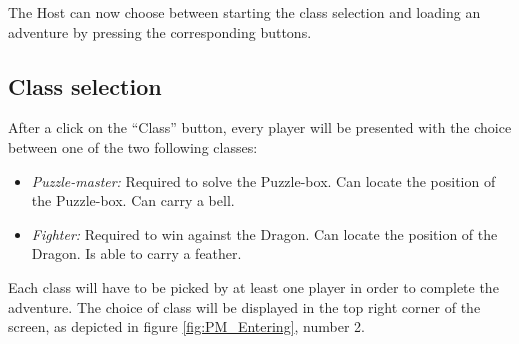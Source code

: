 \documentclass{sigchi-ext}
\begin{document}
The Host can now choose between starting the class selection and loading an adventure by pressing the corresponding buttons.



\subsection{Class selection}

After a click on the ``Class'' button, every player will be presented with the choice between one of the two following classes:
\begin{itemize}\compresslist%
	\item \textit{Puzzle-master:} Required to solve the Puzzle-box. Can locate the position of the Puzzle-box. Can carry a bell.
	\item \textit{Fighter:} Required to win against the Dragon. Can locate the position of the Dragon. Is able to carry a feather.
\end{itemize}

Each class will have to be picked by at least one player in order to complete the adventure. The choice of class will be displayed in the top right corner of the screen, as depicted in figure \ref{fig:PM_Entering}, number 2.
\end{document}
